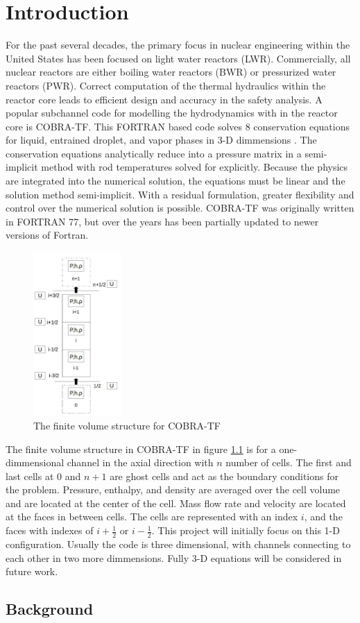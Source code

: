 \vspace*{-80mm}
\chapter{Introduction} \label{chapter1:introduction}

For the past several decades, the primary focus in nuclear engineering
within the United States has been focused on light water reactors (LWR).
Commercially, all nuclear reactors are either boiling water reactors (BWR)
or pressurized water reactors (PWR). Correct computation of the
thermal hydraulics within the reactor core leads to efficient design and
accuracy in the safety analysis. A
popular subchannel code for modelling the hydrodynamics with in the reactor core is COBRA-TF.
This FORTRAN based code solves 8 conservation equations for liquid,
entrained droplet, and vapor phases in 3-D dimmensions \cite{CTF_Theory}.
The conservation equations analytically reduce into a pressure matrix in a
semi-implicit  method with rod temperatures solved for explicitly. Because
the physics are integrated into the numerical solution, the equations must
be linear and the solution method semi-implicit. With a residual
formulation, greater flexibility and control over the numerical solution
is possible. COBRA-TF was originally written in FORTRAN 77, but over
the years has been partially updated to newer versions of Fortran.

\begin{figure}[!h]
	\centering
	\includegraphics[width=0.30\textwidth]{images/CTF-Cells}
	
	\caption{The finite volume structure for COBRA-TF}
	\label{fig:CTF-Cells}
\end{figure}

The finite volume structure in COBRA-TF in figure \ref{fig:CTF-Cells} is for
a one-dimmensional channel in the axial direction with $n$ number of cells.
The first and last cells at $0$ and $n+1$ are ghost cells and act as the
boundary conditions for the problem. Pressure, enthalpy, and density are
averaged over the cell volume and are located at the center of the cell.
Mass flow rate and velocity are located at the faces in between cells. The
cells are represented with an index $i$, and the faces with indexes of
$i+\frac{1}{2}$ or $i-\frac{1}{2}$. This project will initially focus
on this 1-D configuration. Usually the code is three dimensional, with
channels connecting to each other in two more dimmensions. Fully 3-D
equations will be considered in future work.

\section{Background}



